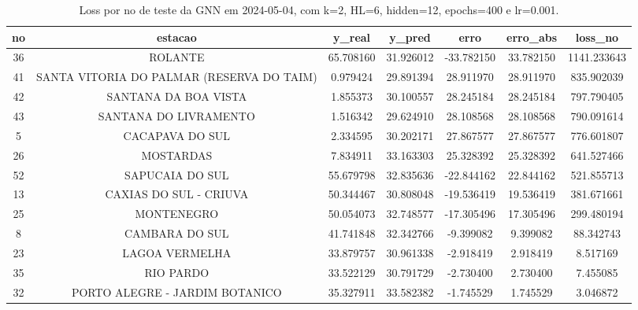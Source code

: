 \begin{table}[h]
\centering
\caption{Loss por no de teste da GNN em 2024-05-04, com k=2, HL=6, hidden=12, epochs=400 e lr=0.001.}
\label{tab:gnn_loss_k2_hl6_h12_e400_d20240504}
\begin{tabular}{ccccccc}
\toprule
no & estacao & y\_real & y\_pred & erro & erro\_abs & loss\_no \\
\midrule
36 & ROLANTE & 65.708160 & 31.926012 & -33.782150 & 33.782150 & 1141.233643 \\
41 & SANTA VITORIA DO PALMAR (RESERVA DO TAIM) & 0.979424 & 29.891394 & 28.911970 & 28.911970 & 835.902039 \\
42 & SANTANA DA BOA VISTA & 1.855373 & 30.100557 & 28.245184 & 28.245184 & 797.790405 \\
43 & SANTANA DO LIVRAMENTO & 1.516342 & 29.624910 & 28.108568 & 28.108568 & 790.091614 \\
5 & CACAPAVA DO SUL & 2.334595 & 30.202171 & 27.867577 & 27.867577 & 776.601807 \\
26 & MOSTARDAS & 7.834911 & 33.163303 & 25.328392 & 25.328392 & 641.527466 \\
52 & SAPUCAIA DO SUL & 55.679798 & 32.835636 & -22.844162 & 22.844162 & 521.855713 \\
13 & CAXIAS DO SUL - CRIUVA & 50.344467 & 30.808048 & -19.536419 & 19.536419 & 381.671661 \\
25 & MONTENEGRO & 50.054073 & 32.748577 & -17.305496 & 17.305496 & 299.480194 \\
8 & CAMBARA DO SUL & 41.741848 & 32.342766 & -9.399082 & 9.399082 & 88.342743 \\
23 & LAGOA VERMELHA & 33.879757 & 30.961338 & -2.918419 & 2.918419 & 8.517169 \\
35 & RIO PARDO & 33.522129 & 30.791729 & -2.730400 & 2.730400 & 7.455085 \\
32 & PORTO ALEGRE - JARDIM BOTANICO & 35.327911 & 33.582382 & -1.745529 & 1.745529 & 3.046872 \\
\bottomrule
\end{tabular}
\end{table}
